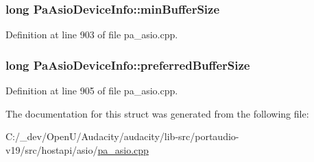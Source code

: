 \subsubsection[{\texorpdfstring{min\+Buffer\+Size}{minBufferSize}}]{\setlength{\rightskip}{0pt plus 5cm}long Pa\+Asio\+Device\+Info\+::min\+Buffer\+Size}\hypertarget{struct_pa_asio_device_info_af0ec4ebc44687f7fe847070b01a84a3b}{}\label{struct_pa_asio_device_info_af0ec4ebc44687f7fe847070b01a84a3b}


Definition at line 903 of file pa\+\_\+asio.\+cpp.

\subsubsection[{\texorpdfstring{preferred\+Buffer\+Size}{preferredBufferSize}}]{\setlength{\rightskip}{0pt plus 5cm}long Pa\+Asio\+Device\+Info\+::preferred\+Buffer\+Size}\hypertarget{struct_pa_asio_device_info_a335fb70be1880dbbd6caee196666173a}{}\label{struct_pa_asio_device_info_a335fb70be1880dbbd6caee196666173a}


Definition at line 905 of file pa\+\_\+asio.\+cpp.



The documentation for this struct was generated from the following file\+:\begin{DoxyCompactItemize}
\item 
C\+:/\+\_\+dev/\+Open\+U/\+Audacity/audacity/lib-\/src/portaudio-\/v19/src/hostapi/asio/\hyperlink{pa__asio_8cpp}{pa\+\_\+asio.\+cpp}\end{DoxyCompactItemize}
